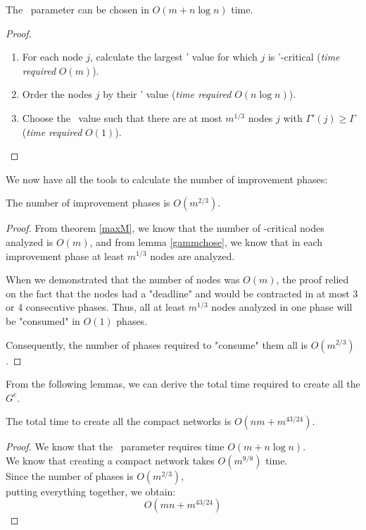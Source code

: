 \begin{lemma}
    \label{gammchose}
    The \gmm\ parameter can be chosen in \( O(m+n\log n) \) time.
\end{lemma}

\begin{proof}
    \begin{enumerate}
        \item For each node \( j \), calculate the largest \gmm' value for which \( j \) is \gmm'-critical (\textit{time required} \( O(m) \)).
        \item Order the nodes \( j \) by their \gmm' value (\textit{time required} \( O(n\log n) \)).
        \item Choose the \gmm\ value such that there are at most \( m^{1/3} \) nodes \( j \) with \( \Gamma'(j) \ge \Gamma \) (\textit{time required} \( O(1) \)).
    \end{enumerate}
\end{proof}

We now have all the tools to calculate the number of improvement phases:

\begin{lemma}
    The number of improvement phases is \( O(m^{2/3}) \).
\end{lemma}

\begin{proof}
    From theorem \ref{maxM}, we know that the number of \gmm-critical nodes analyzed is \( O(m) \), and from lemma \ref{gammchose}, we know that in each improvement phase at least \( m^{1/3} \) nodes are analyzed.

    When we demonstrated that the number of nodes was \( O(m) \), the proof relied on the fact that the nodes had a "deadline" and would be contracted in at most 3 or 4 consecutive phases. Thus, all at least \( m^{1/3} \) nodes analyzed in one phase will be "consumed" in \( O(1) \) phases.

    Consequently, the number of phases required to "consume" them all is \( O(m^{2/3}) \).
\end{proof}

From the following lemmas, we can derive the total time required to create all the \( G^c \).

\begin{lemma}
    The total time to create all the compact networks is \( O(nm + m^{43/24}) \).
\end{lemma}
\begin{proof}
    We know that the \gmm\ parameter requires time \( O(m + n \log n) \).\\
    We know that creating a compact network takes \( O(m^{9/8}) \) time.\\
    Since the number of phases is \( O(m^{2/3}) \),\\
    putting everything together, we obtain:
    \[ O(mn + m^{43/24}) \]
\end{proof}

